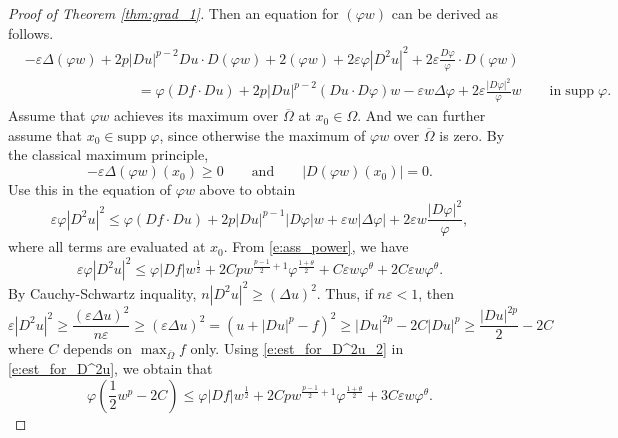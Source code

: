 \documentclass[12pt,reqno]{amsart}
\numberwithin{figure}{section}
\theoremstyle{plain}
\theoremstyle{remark}
\numberwithin{equation}{section}
\begin{document}
\begin{proof}[Proof of Theorem \ref{thm:grad_1}]
Then an equation for $(\varphi w)$ can be derived as follows.
\begin{align*}
    &-\varepsilon \Delta (\varphi w) + 2 p|D u|^{p-2}D u \cdot D (\varphi w) + 2  (\varphi w) + 2 \varepsilon \varphi|D^2u|^2 + 2\varepsilon \frac{D \varphi}{\varphi}\cdot D (\varphi w) \\
    &\qquad\qquad\qquad\qquad = \varphi(D f\cdot D u) + 2 p|D u|^{p-2}(D u\cdot D \varphi)w -\varepsilon w \Delta \varphi + 2\varepsilon \frac{|D \varphi|^2}{\varphi}w
    \qquad\text{in}\;\mathrm{supp}\;\varphi.
\end{align*}
Assume that $\varphi w$ achieves its maximum over $\overline{\Omega}$ at $x_0\in \Omega$. And we can further assume that $x_0\in \mathrm{supp}\;\varphi$, since otherwise the maximum of $\varphi w$ over $\overline{\Omega}$ is zero. By the classical maximum principle, 
\begin{equation*}
    -\varepsilon \Delta(\varphi w)(x_0)\geq 0 \qquad\text{and}\qquad |D(\varphi w)(x_0)| = 0.
\end{equation*}
Use this in the equation of $\varphi w$ above to obtain
\begin{equation*}
    \varepsilon \varphi|D^2u|^2 \leq  \varphi (Df\cdot Du)+ 2 p|Du|^{p-1} |D\varphi|w + \varepsilon w |\Delta\varphi|  + 2\varepsilon  w\frac{|D\varphi|^2}{\varphi},
\end{equation*}
 where all terms are evaluated at $x_0$. From \eqref{e:ass_power}, we have
\begin{equation}\label{e:est_for_D^2u}
    \varepsilon \varphi|D^2u|^2 \leq  \varphi |Df|w^{\frac{1}{2}}+ 2 Cp w^{\frac{p-1}{2}+1} \varphi^{\frac{1+\theta}{2}} + C\varepsilon w \varphi^{\theta} + 2C\varepsilon  w\varphi^\theta.
\end{equation}
By Cauchy-Schwartz inquality, $n|D^2u|^2\geq (\Delta u)^2$. Thus, if $n\varepsilon < 1$, then
\begin{equation}\label{e:est_for_D^2u_2}
    \varepsilon |D^2u|^2 \geq \frac{(\varepsilon \Delta u)^2}{n\varepsilon} \geq (\varepsilon \Delta u)^2 = \left(  u + |Du|^p - f\right)^2 \geq |Du|^{2p} - 2C|Du|^p \geq \frac{|Du|^{2p}}{2} - 2C
\end{equation}
where $C$ depends on $\max_{\overline{\Omega}}f$ only. Using \eqref{e:est_for_D^2u_2} in \eqref{e:est_for_D^2u}, we obtain that
\begin{equation*}
    \varphi\left(\frac{1}{2}w^p - 2C\right) \leq \varphi |Df|w^{\frac{1}{2}}+ 2 Cp w^{\frac{p-1}{2}+1} \varphi^{\frac{1+\theta}{2}} + 3C\varepsilon w \varphi^{\theta}.

\end{equation*}
\end{proof}
\end{document}
